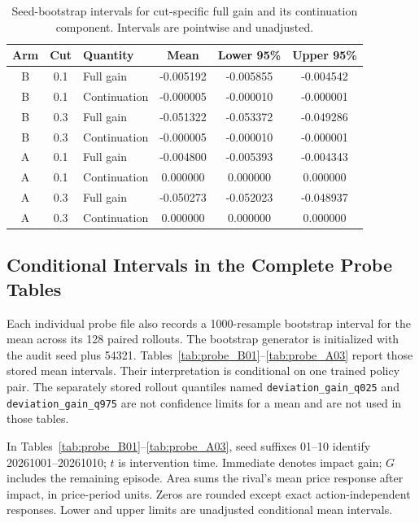 \begin{table}[t]
\centering
\caption{Seed-bootstrap intervals for cut-specific full gain and its continuation component. Intervals are pointwise and unadjusted.}
\label{tab:bootstrap_ci}
\small
{}
\begin{tabular}{@{}cc l SSS@{}}
\toprule
Arm & Cut & Quantity & {Mean} & {Lower 95\%} & {Upper 95\%} \\
\midrule
B & 0.1 & Full gain      & -0.005192 & -0.005855 & -0.004542 \\
B & 0.1 & Continuation   & -0.000005 & -0.000010 & -0.000001 \\
B & 0.3 & Full gain      & -0.051322 & -0.053372 & -0.049286 \\
B & 0.3 & Continuation   & -0.000005 & -0.000010 & -0.000001 \\
A & 0.1 & Full gain      & -0.004800 & -0.005393 & -0.004343 \\
A & 0.1 & Continuation   &  0.000000 &  0.000000 &  0.000000 \\
A & 0.3 & Full gain      & -0.050273 & -0.052023 & -0.048937 \\
A & 0.3 & Continuation   &  0.000000 &  0.000000 &  0.000000 \\
\bottomrule
\end{tabular}
\end{table}

\subsection{Conditional Intervals in the Complete Probe Tables}

Each individual probe file also records a \num{1000}-resample bootstrap interval for the mean across its 128 paired rollouts. The bootstrap generator is initialized with the audit seed plus \num{54321}. Tables~\ref{tab:probe_B01}--\ref{tab:probe_A03} report those stored mean intervals. Their interpretation is conditional on one trained policy pair. The separately stored rollout quantiles named \texttt{deviation\_gain\_q025} and \texttt{deviation\_gain\_q975} are not confidence limits for a mean and are not used in those tables.

In Tables~\ref{tab:probe_B01}--\ref{tab:probe_A03}, seed suffixes 01--10 identify 20261001--20261010; $t$ is intervention time. Immediate denotes impact gain; $G$ includes the remaining episode. Area sums the rival's mean price response after impact, in price-period units. Zeros are rounded except exact action-independent responses. Lower and upper limits are unadjusted conditional mean intervals.

